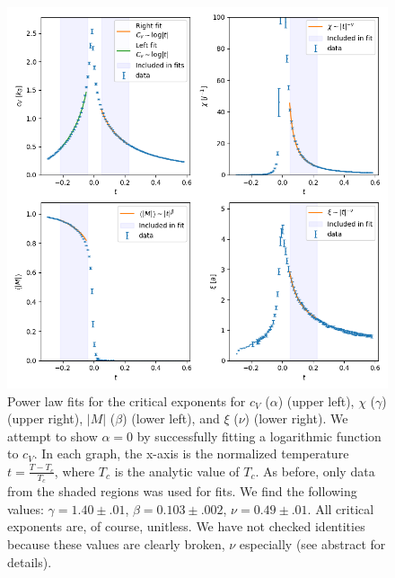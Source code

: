 \documentclass[letter,scriptaddress,twocolumn, prl]{revtex4}
\begin{document}
\begin{figure}[h]
	\begin{center}
		\includegraphics[width=1\textwidth]{figs/fig5_crit_exponents.png}
		\caption{Power law fits for the critical exponents for $c_V$ ($\alpha$) (upper left), $\chi$ ($\gamma$) (upper right), $|M|$ ($\beta$) (lower left), and $\xi$ ($\nu$) (lower right). We attempt to show $\alpha = 0$ by successfully fitting a logarithmic function to $c_V$. In each graph, the x-axis is the normalized temperature $t = \frac{T - T_c}{T_c}$, where $T_c$ is the analytic value of $T_c$. As before, only data from the shaded regions was used for fits. We find the following values: $\gamma = 1.40 \pm .01$, $\beta = 0.103 \pm .002$, $\nu = 0.49 \pm .01$. All critical exponents are, of course, unitless. We have not checked identities because these values are clearly broken, $\nu$ especially (see abstract for details).}
		\label{fig:fig5}
	\end{center}
\end{figure}

\end{document}
